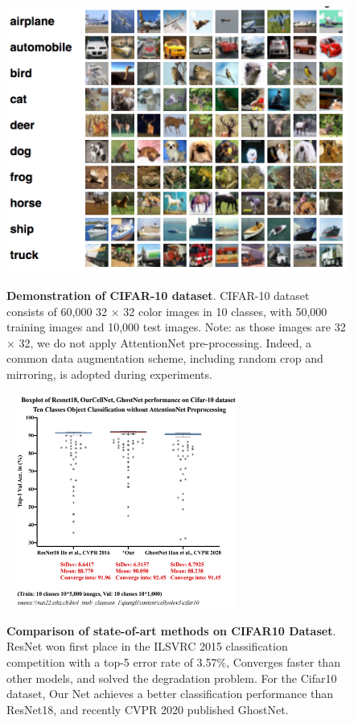 \begin{figure}[ht]
\begin{center}
\includegraphics[height=0.3\textheight]{thesis-template-master/images/cifardataset.png}
\label{fig:cellnet}
\end{center}
\caption{\textbf{Demonstration of CIFAR-10 dataset}. CIFAR-10 dataset consists of 60,000  32 × 32 color images in 10 classes, with 50,000 training images and 10,000 test images. Note: as those images are  32 × 32, we do not apply AttentionNet pre-processing. Indeed, a common data augmentation scheme, including random crop and mirroring, is adopted during experiments.}
\end{figure}




\begin{figure}[t]
\begin{center}
\includegraphics[height=200pt,width=0.7\textwidth]{thesis-template-master/images/Cifar-12-06-2020.png}
\label{fig:cellnet}
\end{center}
\caption{\textbf{Comparison of state-of-art methods on CIFAR10 Dataset}.  ResNet won first place in the ILSVRC 2015 classification competition with a top-5 error rate of 3.57\%, Converges faster than other models, and solved the degradation problem. For the Cifar10 dataset, Our Net achieves a better classification performance than ResNet18, and recently CVPR 2020 published GhostNet.}
\end{figure}


